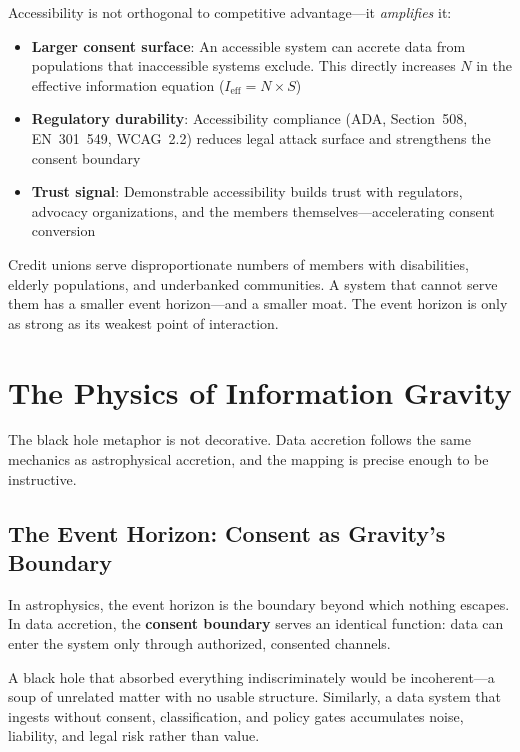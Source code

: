 \documentclass[11pt,twocolumn]{article}
\begin{document}
Accessibility is not orthogonal to competitive advantage---it \emph{amplifies} it:

\begin{itemize}[nosep,leftmargin=1.2em]
  \item \textbf{Larger consent surface}: An accessible system can accrete data from populations that inaccessible systems exclude. This directly increases $N$ in the effective information equation ($I_{\text{eff}} = N \times S$)
  \item \textbf{Regulatory durability}: Accessibility compliance (ADA, Section~508, EN~301~549, WCAG~2.2) reduces legal attack surface and strengthens the consent boundary
  \item \textbf{Trust signal}: Demonstrable accessibility builds trust with regulators, advocacy organizations, and the members themselves---accelerating consent conversion
\end{itemize}

Credit unions serve disproportionate numbers of members with disabilities, elderly populations, and underbanked communities. A system that cannot serve them has a smaller event horizon---and a smaller moat. The event horizon is only as strong as its weakest point of interaction.

\section{The Physics of Information Gravity}

The black hole metaphor is not decorative. Data accretion follows the same mechanics as astrophysical accretion, and the mapping is precise enough to be instructive.

\subsection{The Event Horizon: Consent as Gravity's Boundary}

In astrophysics, the event horizon is the boundary beyond which nothing escapes. In data accretion, the \textbf{consent boundary} serves an identical function: data can enter the system only through authorized, consented channels.

A black hole that absorbed everything indiscriminately would be incoherent---a soup of unrelated matter with no usable structure. Similarly, a data system that ingests without consent, classification, and policy gates accumulates noise, liability, and legal risk rather than value.
\end{document}
